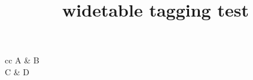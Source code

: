 \documentclass{article}
\title{widetable tagging test}
\begin{document}
\begin{widetabular}{\linewidth}{cc}
A & B \\
C & D
\end{widetabular}
\end{document}
